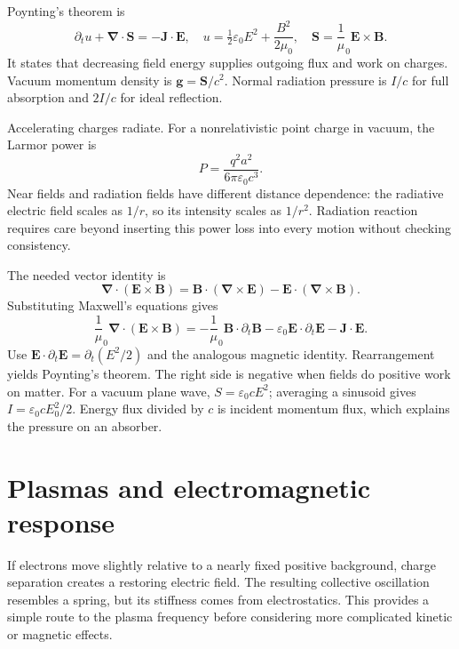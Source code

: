 \documentclass[11pt,oneside]{book}
\newcommand{\vect}[1]{\boldsymbol{#1}}
\newcommand{\grad}{\boldsymbol{\nabla}}
\newcommand{\eps}{\varepsilon_0}
\newcommand{\mun}{\mu_0}
\theoremstyle{reviewstyle}
\begin{document}
Poynting's theorem is
\begin{equation}
\partial_tu+\grad\cdot\vect S=-\vect J\cdot\vect E,
\quad u=\tfrac12\eps E^2+\frac{B^2}{2\mun},\quad
\vect S=\frac1\mun\vect E\times\vect B.
\end{equation}
It states that decreasing field energy supplies outgoing flux and work on charges. Vacuum momentum density is $\vect g=\vect S/c^2$. Normal radiation pressure is $I/c$ for full absorption and $2I/c$ for ideal reflection.

Accelerating charges radiate. For a nonrelativistic point charge in vacuum, the Larmor power is
\begin{equation}P=\frac{q^2a^2}{6\pi\eps c^3}.\end{equation}
Near fields and radiation fields have different distance dependence: the radiative electric field scales as $1/r$, so its intensity scales as $1/r^2$. Radiation reaction requires care beyond inserting this power loss into every motion without checking consistency.

The needed vector identity is
\begin{equation}
\grad\cdot(\vect E\times\vect B)
=\vect B\cdot(\grad\times\vect E)-\vect E\cdot(\grad\times\vect B).
\end{equation}
Substituting Maxwell's equations gives
\begin{equation}
\frac1\mun\grad\cdot(\vect E\times\vect B)
=-\frac1\mun\vect B\cdot\partial_t\vect B
-\eps\vect E\cdot\partial_t\vect E-\vect J\cdot\vect E.
\end{equation}
Use $\vect E\cdot\partial_t\vect E=\partial_t(E^2/2)$ and the analogous magnetic identity. Rearrangement yields Poynting's theorem. The right side is negative when fields do positive work on matter. For a vacuum plane wave, $S=\eps cE^2$; averaging a sinusoid gives $I=\eps cE_0^2/2$. Energy flux divided by $c$ is incident momentum flux, which explains the pressure on an absorber.

\section{Plasmas and electromagnetic response}
If electrons move slightly relative to a nearly fixed positive background, charge separation creates a restoring electric field. The resulting collective oscillation resembles a spring, but its stiffness comes from electrostatics. This provides a simple route to the plasma frequency before considering more complicated kinetic or magnetic effects.
\end{document}
